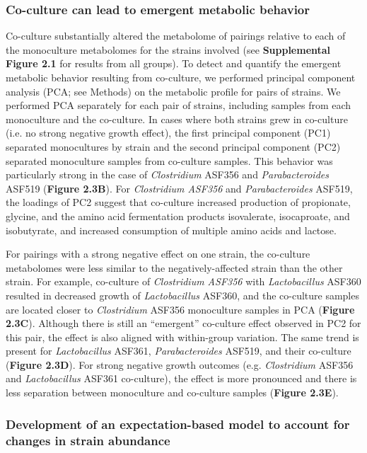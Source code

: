 \documentclass[11pt,onecolumn,notitlepage,openany,twoside]{book}
\begin{document}
\begin{refsection}
\subsubsection{Co-culture can lead to emergent metabolic behavior}

Co-culture substantially altered the metabolome of pairings relative to each of the monoculture metabolomes for the strains involved (see \textbf{Supplemental Figure 2.1} for results from all groups). To detect and quantify the emergent metabolic behavior resulting from co-culture, we performed principal component analysis (PCA; see Methods) on the metabolic profile for pairs of strains. We performed PCA separately for each pair of strains, including samples from each monoculture and the co-culture. In cases where both strains grew in co-culture (i.e. no strong negative growth effect), the first principal component (PC1) separated monocultures by strain and the second principal component (PC2) separated monoculture samples from co-culture samples. This behavior was particularly strong in the case of \textit{Clostridium} ASF356 and \textit{Parabacteroides} ASF519 (\textbf{Figure 2.3B}). For \textit{Clostridium ASF356} and \textit{Parabacteroides} ASF519, the loadings of PC2 suggest that co-culture increased production of propionate, glycine, and the amino acid fermentation products isovalerate, isocaproate, and isobutyrate, and increased consumption of multiple amino acids and lactose.

For pairings with a strong negative effect on one strain, the co-culture metabolomes were less similar to the negatively-affected strain than the other strain. For example, co-culture of \textit{Clostridium ASF356} with \textit{Lactobacillus} ASF360 resulted in decreased growth of \textit{Lactobacillus} ASF360, and the co-culture samples are located closer to \textit{Clostridium} ASF356 monoculture samples in PCA (\textbf{Figure 2.3C}). Although there is still an “emergent” co-culture effect observed in PC2 for this pair, the effect is also aligned with within-group variation. The same trend is present for \textit{Lactobacillus} ASF361, \textit{Parabacteroides} ASF519, and their co-culture (\textbf{Figure 2.3D}). For strong negative growth outcomes (e.g. \textit{Clostridium} ASF356 and \textit{Lactobacillus} ASF361 co-culture), the effect is more pronounced and there is less separation between monoculture and co-culture samples (\textbf{Figure 2.3E}).

\subsubsection{Development of an expectation-based model to account for changes in strain abundance}


\end{refsection}
\end{document}
